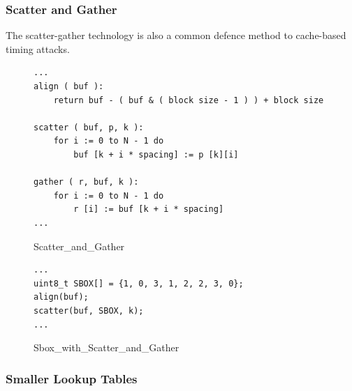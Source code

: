 \subsubsection{Scatter and Gather}
The scatter-gather technology is also a common defence method to cache-based timing attacks.
\begin{figure}[h!]
    \centering
    \begin{lstlisting}[xleftmargin=.02\textwidth,xrightmargin=.01\textwidth]
...
align ( buf ):
    return buf - ( buf & ( block size - 1 ) ) + block size

scatter ( buf, p, k ):
    for i := 0 to N - 1 do
        buf [k + i * spacing] := p [k][i]

gather ( r, buf, k ):
    for i := 0 to N - 1 do
        r [i] := buf [k + i * spacing]
...
\end{lstlisting}
    \caption{Scatter\_and\_Gather}
    \label{Scatter_and_Gather}
\end{figure}

\begin{figure}[h!]
    \centering
    \begin{lstlisting}[xleftmargin=.02\textwidth,xrightmargin=.01\textwidth]
...
uint8_t SBOX[] = {1, 0, 3, 1, 2, 2, 3, 0};
align(buf);
scatter(buf, SBOX, k);
...
\end{lstlisting}
    \caption{Sbox\_with\_Scatter\_and\_Gather}
    \label{SBOX_sg}
\end{figure}

\subsubsection{Smaller Lookup Tables}
